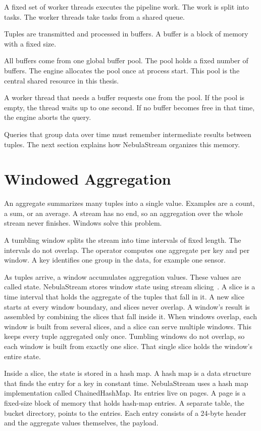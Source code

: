 A fixed set of worker threads executes the pipeline work.
The work is split into tasks.
The worker threads take tasks from a shared queue.

Tuples are transmitted and processed in buffers.
A buffer is a block of memory with a fixed size.

All buffers come from one global buffer pool.
The pool holds a fixed number of buffers.
The engine allocates the pool once at process start.
This pool is the central shared resource in this thesis.

A worker thread that needs a buffer requests one from the pool.
If the pool is empty, the thread waits up to one second.
If no buffer becomes free in that time, the engine aborts the query.

Queries that group data over time must remember intermediate results between tuples.
The next section explains how NebulaStream organizes this memory.

\section{Windowed Aggregation\label{sec:bg-windows}}

An aggregate summarizes many tuples into a single value.
Examples are a count, a sum, or an average.
A stream has no end, so an aggregation over the whole stream never finishes.
Windows solve this problem.

A tumbling window splits the stream into time intervals of fixed length.
The intervals do not overlap.
The operator computes one aggregate per key and per window.
A key identifies one group in the data, for example one sensor.

As tuples arrive, a window accumulates aggregation values.
These values are called state.
NebulaStream stores window state using stream slicing~\cite{TraubGCBKRM20}.
A slice is a time interval that holds the aggregate of the tuples that fall in it.
A new slice starts at every window boundary, and slices never overlap.
A window's result is assembled by combining the slices that fall inside it.
When windows overlap, each window is built from several slices, and a slice can serve multiple windows.
This keeps every tuple aggregated only once.
Tumbling windows do not overlap, so each window is built from exactly one slice.
That single slice holds the window's entire state.

Inside a slice, the state is stored in a hash map.
A hash map is a data structure that finds the entry for a key in constant time.
NebulaStream uses a hash map implementation called ChainedHashMap.
Its entries live on pages.
A page is a fixed-size block of memory that holds hash-map entries.
A separate table, the bucket directory, points to the entries.
Each entry consists of a 24-byte header and the aggregate values themselves, the payload.

